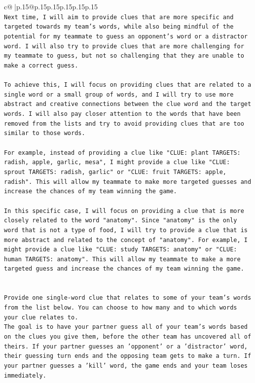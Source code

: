 \documentclass{article}
\begin{document}
{\begin{supertabular}{c@{$\;$}|p{.15\linewidth}@{}p{.15\linewidth}p{.15\linewidth}p{.15\linewidth}p{.15\linewidth}p{.15\linewidth}}
{{{\\ 
\texttt{Next time, I will aim to provide clues that are more specific and targeted towards my team's words, while also being mindful of the potential for my teammate to guess an opponent's word or a distractor word. I will also try to provide clues that are more challenging for my teammate to guess, but not so challenging that they are unable to make a correct guess.} \\
\\ 
\texttt{To achieve this, I will focus on providing clues that are related to a single word or a small group of words, and I will try to use more abstract and creative connections between the clue word and the target words. I will also pay closer attention to the words that have been removed from the lists and try to avoid providing clues that are too similar to those words.} \\
\\ 
\texttt{For example, instead of providing a clue like "CLUE: plant TARGETS: radish, apple, garlic, mesa", I might provide a clue like "CLUE: sprout TARGETS: radish, garlic" or "CLUE: fruit TARGETS: apple, radish". This will allow my teammate to make more targeted guesses and increase the chances of my team winning the game.} \\
\\ 
\texttt{In this specific case, I will focus on providing a clue that is more closely related to the word "anatomy". Since "anatomy" is the only word that is not a type of food, I will try to provide a clue that is more abstract and related to the concept of "anatomy". For example, I might provide a clue like "CLUE: study TARGETS: anatomy" or "CLUE: human TARGETS: anatomy". This will allow my teammate to make a more targeted guess and increase the chances of my team winning the game.} \\
\\ 
\\ 
\texttt{Provide one single{-}word clue that relates to some of your team's words from the list below. You can choose to how many and to which words your clue relates to.} \\
\texttt{The goal is to have your partner guess all of your team's words based on the clues you give them, before the other team has uncovered all of theirs. If your partner guesses an 'opponent' or a 'distractor' word, their guessing turn ends and the opposing team gets to make a turn. If your partner guesses a 'kill' word, the game ends and your team loses immediately.} \\
}}}
\end{supertabular}}
\end{document}
